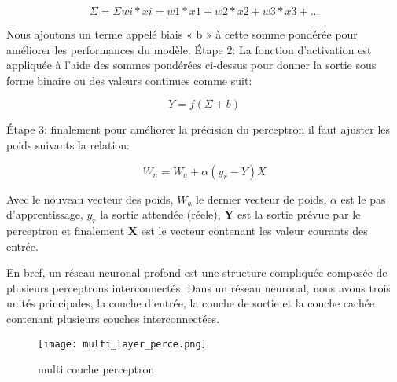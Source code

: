             \begin{equation}\label{eq:per_sum}
                \Sigma = \Sigma wi*xi = w1*x1 + w2*x2 + w3*x3 + \dots
            \end{equation}


            Nous ajoutons un terme appelé biais « b » à cette somme pondérée pour améliorer les performances du modèle. 
            Étape 2: La fonction d'activation est appliquée à l'aide des sommes pondérées ci-dessus pour donner la sortie sous forme binaire ou des valeurs continues comme suit:


            \begin{equation}\label{eq:per_sum}
                Y = f(\Sigma + b)
            \end{equation}

            Étape 3: finalement pour améliorer la précision du perceptron il faut ajuster les poids suivants la relation:

            \begin{equation}\label{eq:per_weights}
                W_n = W_a + \alpha (y_r - Y) X
            \end{equation}
            

            Avec  le nouveau vecteur des poids, \textbf{\(W_a\)} le dernier vecteur de poids, \textbf{\(\alpha\)} est le pas d'apprentissage, \textbf{\(y_r\)} la sortie attendée (réele), \textbf{Y} est la sortie prévue par le perceptron et finalement \textbf{X} est le vecteur contenant les valeur courants des entrée.

        En bref, un réseau neuronal profond est une structure compliquée composée de plusieurs perceptrons interconnectés. Dans un réseau neuronal, nous avons trois unités principales, la couche d'entrée, la couche de sortie et la couche cachée contenant plusieurs couches interconnectées.
        
        \begin{figure}[H] 
            \centering
            \texttt{[image: multi\_layer\_perce.png]}
            \caption{multi couche perceptron}
            \label{fig:m_l_p}
        \end{figure}

